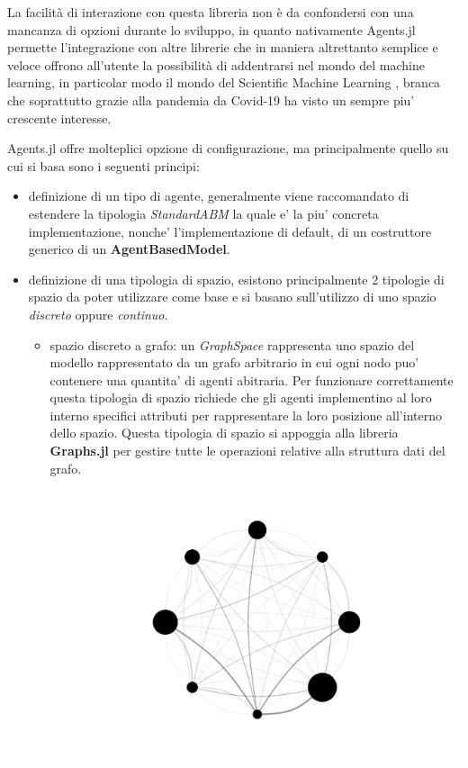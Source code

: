 La facilità di interazione con questa libreria non è da 
confondersi con una mancanza di opzioni durante lo sviluppo, 
in quanto nativamente Agents.jl permette l’integrazione con 
altre librerie che in maniera altrettanto semplice e veloce 
offrono all’utente la possibilità 
di addentrarsi nel mondo del machine learning, in particolar 
modo il mondo del Scientific Machine Learning 
\cite{rackauckas2017differentialequations}, 
branca che soprattutto grazie alla pandemia da Covid-19 ha 
visto un sempre piu' crescente interesse. 

Agents.jl offre molteplici opzione di configurazione, ma 
principalmente quello su cui si basa sono i seguenti principi:

\begin{itemize}
    \item definizione di un tipo di agente, generalmente viene raccomandato di 
    estendere la tipologia \emph{StandardABM} la quale e' la piu' concreta implementazione,
    nonche' l'implementazione di default, di un costruttore generico di un \textbf{AgentBasedModel}.
    \item definizione di una tipologia di spazio, esistono principalmente 2 tipologie 
    di spazio da poter utilizzare come base e si basano sull'utilizzo di uno spazio \emph{discreto}
    oppure \emph{continuo}.
    \begin{itemize}
        \item spazio discreto a grafo: un \emph{GraphSpace} rappresenta uno spazio del modello
        rappresentato da un grafo arbitrario in cui ogni nodo puo' contenere una 
        quantita' di agenti abitraria. Per funzionare correttamente questa tipologia di 
        spazio richiede che gli agenti implementino al loro interno specifici attributi
        per rappresentare la loro posizione all'interno dello spazio. Questa tipologia di spazio
        si appoggia alla libreria \textbf{Graphs.jl} \cite{Graphs2021} per gestire tutte le operazioni relative
        alla struttura dati del grafo.  

        \begin{minipage}{\linewidth}
            \centering
            \includegraphics[width=\textwidth]{img/graph.png}
            \label{fig:graphspace_representation}
        \end{minipage}
        

\end{itemize}
\end{itemize}
